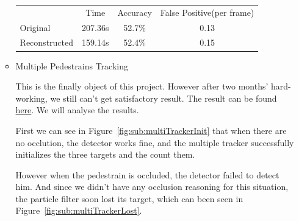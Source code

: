 \documentclass[a4paper]{article}
\begin{document}
\begin{enumerate}
\begin{itemize}
\begin{center}
\begin{tabular}{l | c | c | c}
\hline
                & Time    & Accuracy  & False Positive(per frame) \\
Original        & 207.36s &  52.7\%   &  0.13                     \\
Reconstructed   & 159.14s &  52.4\%   &  0.15                     \\
\hline
\end{tabular}
\end{center}

\item Multiple Pedestrains Tracking

This is the finally object of this project. However after two months' hard-working, we still can't get satisfactory result. The result can be found \href{https://zerowong.github.io/PedestrainCounting/results/multiTargetTracking01.avi}{here}. We will analyse the results.

First we can see in Figure~\ref{fig:sub:multiTrackerInit} that when there are no occlution, the detector works fine, and the multiple tracker successfully initializes the three targets and the count them.

However when the pedestrain is occluded, the detector failed to detect him. And since we didn't have any occlusion reasoning for this situation, the particle filter soon lost its target, which can been seen in Figure~\ref{fig:sub:multiTrackerLost}.


\end{itemize}
\end{enumerate}
\end{document}
